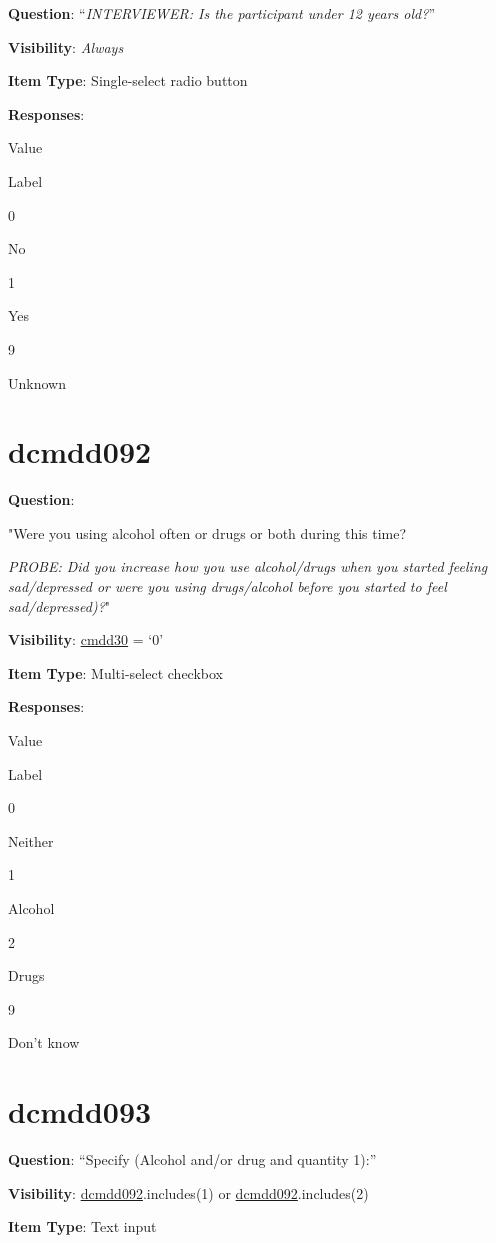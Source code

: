 \documentclass[]{book}
\begin{document}
\textbf{Question}: ``\emph{INTERVIEWER: Is the participant under 12 years old?}''

\textbf{Visibility}: \emph{Always}

\textbf{Item Type}: Single-select radio button

\textbf{Responses}:

Value

Label

0

No

1

Yes

9

Unknown

\hypertarget{dcmdd092}{%
\section{dcmdd092}\label{dcmdd092}}

\textbf{Question}:

"Were you using alcohol often or drugs or both during this time?

\emph{PROBE: Did you increase how you use alcohol/drugs when you started feeling sad/depressed or were you using drugs/alcohol before you started to feel sad/depressed)?}"

\textbf{Visibility}: \protect\hyperlink{cmdd30}{cmdd30} = `0'

\textbf{Item Type}: Multi-select checkbox

\textbf{Responses}:

Value

Label

0

Neither

1

Alcohol

2

Drugs

9

Don't know

\hypertarget{dcmdd093}{%
\section{dcmdd093}\label{dcmdd093}}

\textbf{Question}: ``Specify (Alcohol and/or drug and quantity 1):''

\textbf{Visibility}: \protect\hyperlink{dcmdd092}{dcmdd092}.includes(1) or \protect\hyperlink{dcmdd092}{dcmdd092}.includes(2)

\textbf{Item Type}: Text input
\end{document}
